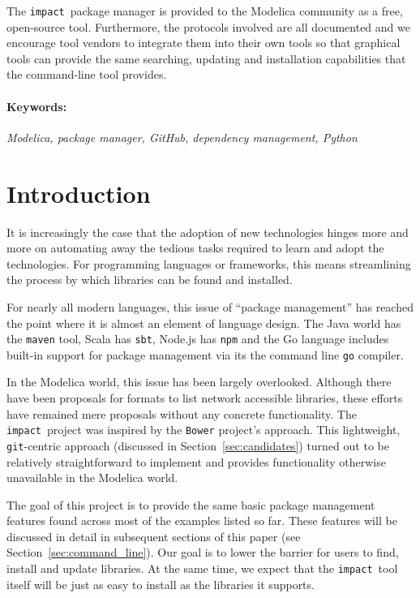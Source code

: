 \documentclass[11pt,a4paper,twocolumn]{article}
\newcommand{\impact}{\texttt{impact}} %
\newcommand{\code}[1]{\texttt{#1}} %
\begin{document}
The \impact\ package manager is provided to the Modelica community as
a free, open-source tool.  Furthermore, the protocols involved are all
documented and we encourage tool vendors to integrate them into their
own tools so that graphical tools can provide the same searching,
updating and installation capabilities that the command-line tool
provides.

\paragraph{Keywords:}
\emph{Modelica, package manager, GitHub, dependency management, Python}

\section{Introduction}
\label{sec:intro}

It is increasingly the case that the adoption of new technologies
hinges more and more on automating away the tedious tasks required to
learn and adopt the technologies.  For programming languages or
frameworks, this means streamlining the process by which libraries can
be found and installed.

For nearly all modern languages, this issue of ``package management''
has reached the point where it is almost an element of language
design.  The Java world has the \code{maven} tool, Scala has
\code{sbt}, Node.js has \code{npm} and the Go language includes
built-in support for package management via its the command line
\code{go} compiler.

In the Modelica world, this issue has been largely overlooked.
Although there have been proposals for formats to list network
accessible libraries, these efforts have remained mere proposals
without any concrete functionality.  The \impact\ project was inspired
by the \code{Bower}\cite{Bower} project's approach.  This lightweight,
\code{git}-centric approach (discussed in Section~\ref{sec:candidates})
turned out to be relatively straightforward to implement and provides
functionality otherwise unavailable in the Modelica world.

The goal of this project is to provide the same basic package
management features found across most of the examples listed so far.
These features will be discussed in detail in subsequent sections of
this paper (see Section~\ref{sec:command_line}).  Our goal is to lower
the barrier for users to find, install and update libraries.  At the
same time, we expect that the \impact\ tool itself will be just as
easy to install as the libraries it supports.
\end{document}
